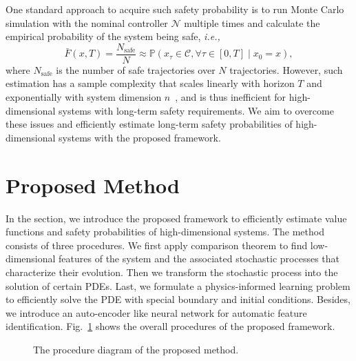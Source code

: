 \documentclass[letterpaper]{article} %
\newcommand{\ie}{\textit{i.e., }}
\newcommand{\pr}{\mathbb{P}}
\begin{document}
One standard approach to acquire such safety probability is to run Monte Carlo simulation with the nominal controller $\mathcal{N}$ multiple times and calculate the empirical probability of the system being safe, \ie
\begin{equation}
    \bar{F}(x,T) = \frac{N_\text{safe}}{N} \approx \pr(x_\tau \in \mathcal{C}, \forall \tau \in [0,T] \mid x_0 = x),
\end{equation}
where $N_\text{safe}$ is the number of safe trajectories over $N$ trajectories. However, such estimation has a sample complexity that scales linearly with horizon $T$ and exponentially with system dimension $n$~\cite{rubino2009rare, wang2021myopically}, and is thus inefficient for high-dimensional systems with long-term safety requirements. We aim to overcome these issues and efficiently estimate long-term safety probabilities of high-dimensional systems with the proposed framework.




\section{Proposed Method}
\label{sec:proposed_method}
In the section, we introduce the proposed framework to efficiently estimate value functions and safety probabilities of high-dimensional systems. The method consists of three procedures. We first apply comparison theorem to find low-dimensional features of the system and the associated stochastic processes that characterize their evolution.
Then we transform the stochastic process into the solution of certain PDEs.
Last, we formulate a physics-informed learning problem to efficiently solve the PDE with special boundary and initial conditions. Besides, we introduce an auto-encoder like neural network for automatic feature identification. Fig.~\ref{fig:flowchart} shows the overall procedures of the proposed framework.

\begin{figure}[t]
    \centering
    
    \caption{The procedure diagram of the proposed method.}
    \label{fig:flowchart}
\end{figure}
\end{document}
